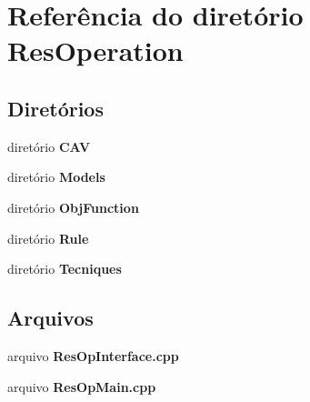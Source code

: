 \section{Referência do diretório Res\+Operation}
\label{dir_cb328c57eb903414ca65d9e3348bbc77}
\subsection*{Diretórios}
\begin{DoxyCompactItemize}
\item 
diretório {\bf C\+AV}
\item 
diretório {\bf Models}
\item 
diretório {\bf Obj\+Function}
\item 
diretório {\bf Rule}
\item 
diretório {\bf Tecniques}
\end{DoxyCompactItemize}
\subsection*{Arquivos}
\begin{DoxyCompactItemize}
\item 
arquivo {\bf Res\+Op\+Interface.\+cpp}
\item 
arquivo {\bf Res\+Op\+Main.\+cpp}
\end{DoxyCompactItemize}
